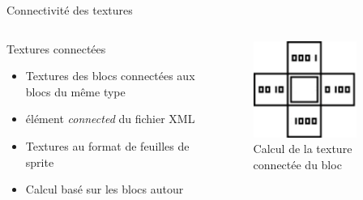 \documentclass{beamer}
\begin{document}
{\begin{frame}{Connectivité des textures}
    \begin{columns}
            \begin{block}{Textures connectées}
                \begin{itemize}
                    \item[\bullet] Textures des blocs connectées aux blocs du même type
                    \item[\bullet] élément \emph{connected} du fichier XML
                    \item[\bullet] Textures au format de feuilles de sprite
                    \item[\bullet] Calcul basé sur les blocs autour
                \end{itemize}
            \end{block}
            \begin{figure}
                \centering
                \includegraphics[width=0.8\textwidth]{connected_textures_offset_computing}
                \caption{Calcul de la texture connectée du bloc}
            \end{figure}
    \end{columns}
\end{frame}

}
\end{document}
